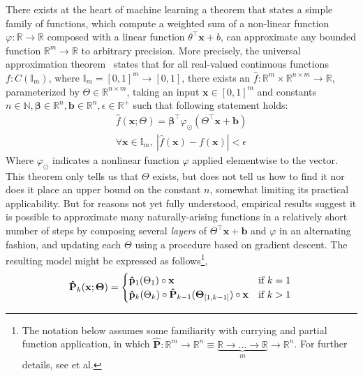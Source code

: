 There exists at the heart of machine learning a theorem that states a simple family of functions, which compute a weighted sum of a non-linear function $\varphi: \mathbb{R} \rightarrow \mathbb{R}$ composed with a linear function $\theta^\intercal \mathbf{x} + b$, can approximate any bounded function $\mathbb{R}^m\rightarrow\mathbb{R}$ to arbitrary precision. More precisely, the universal approximation theorem~\citep{hornik1989multilayer} states that for all real-valued continuous functions $f: C(\mathbb{I}_m)$, where $\mathbb{I}_m = [0, 1]^m \rightarrow [0, 1]$, there exists an $\hat f: \mathbb{R}^m \times \mathbb{R}^{n \times m} \rightarrow \mathbb{R}$, parameterized by $\Theta \in \mathbb{R}^{n \times m}$, taking an input $\mathbf x \in [0, 1]^m$ and constants $n \in \mathbb{N}, \mathbf{\beta} \in \mathbb{R}^n, \mathbf{b} \in \mathbb{R}^n, \epsilon \in \mathbb{R}^+$ such that following statement holds:
%
\begin{equation}
    \begin{split}
        \hat{f}(\mathbf{x}; \Theta) = \mathbf{\beta}^\intercal \varphi_{\odot} \left(\Theta^\intercal \mathbf{x} + \mathbf{b}\right) \\
        \forall \mathbf{x} \in \mathbb{I}_m, \ | \hat f( \mathbf{x} ) - f ( \mathbf{x} ) | < \epsilon
    \end{split}
\end{equation}
%
Where $\varphi_{\odot}$ indicates a nonlinear function $\varphi$ applied elementwise to the vector. This theorem only tells us that $\Theta$ exists, but does not tell us how to find it nor does it place an upper bound on the constant $n$, somewhat limiting its practical applicability. But for reasons not yet fully understood, empirical results suggest it is possible to approximate many naturally-arising functions in a relatively short number of steps by composing several \textit{layers} of $\Theta^\intercal \mathbf{x} + \mathbf{b}$ and $\varphi$ in an alternating fashion, and updating each $\Theta$ using a procedure based on gradient descent. The resulting model might be expressed as follows\footnote{The notation below assumes some familiarity with currying and partial function application, in which $\mathbf{\hat P}: \mathbb{R}^m \rightarrow \mathbb{R}^n \equiv \underbrace{\mathbb R \rightarrow \ldots \rightarrow \mathbb R}_{m}\rightarrow \mathbb{R}^n$. For further details, see \citet{schonfinkel1924bausteine, curry1958combinatory} et al.},
%
\begin{equation} \label{eq:recursive_parametric_eq}
\mathbf{\hat P}_k(\mathbf{x}; \bm\Theta) = \begin{cases} \mathbf{\hat p}_1(\Theta_1)\circ\mathbf{x} &\text{if } k=1\\ \mathbf{\hat p}_k(\Theta_k)\circ \mathbf{\hat P}_{k-1}(\bm\Theta_{[1, k-1]})\circ\mathbf{x}&\text{if } k > 1 \end{cases} \\
\end{equation}
